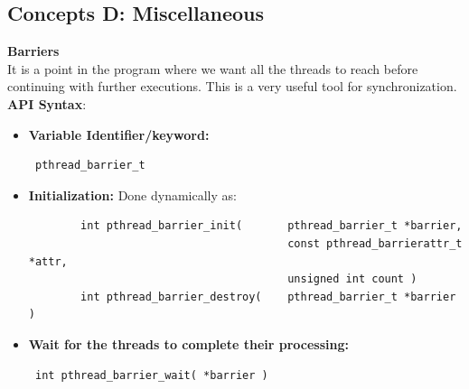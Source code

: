 \documentclass[12pt, a4paper]{report}
\begin{document}
\subsection*{Concepts D: Miscellaneous}
{\bfseries{Barriers}}\\
It is a point in the program where we want all the threads to reach before continuing with further executions. This is a very useful 
tool for synchronization.\\
{\bfseries{API Syntax}}:
\begin{itemize}
    \item {\bfseries{Variable Identifier/keyword:}} \begin{verbatim} pthread_barrier_t \end{verbatim} 
    \item {\bfseries{Initialization:}} Done dynamically as: 
    \begin{verbatim} 
        int pthread_barrier_init(       pthread_barrier_t *barrier,
                                        const pthread_barrierattr_t *attr,
                                        unsigned int count ) 
        int pthread_barrier_destroy(    pthread_barrier_t *barrier ) 
    \end{verbatim}
    \item {\bfseries{Wait for the threads to complete their processing:}}
          \begin{verbatim} int pthread_barrier_wait( *barrier ) \end{verbatim}
\end{itemize}
\end{document}
